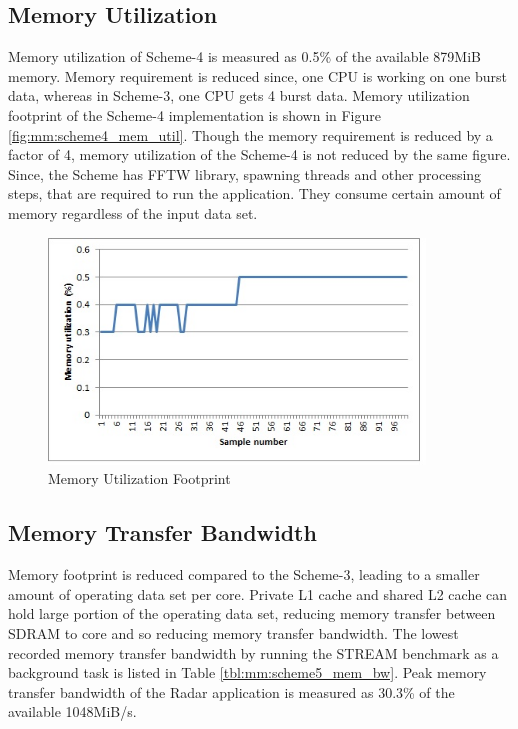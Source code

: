 \subsection{Memory Utilization}
\label{ss:mm:scheme5:mem_util}
Memory utilization of Scheme-4 is measured as 0.5\% of the available 879MiB memory. Memory requirement is reduced since, one CPU is working on one burst data, whereas in Scheme-3, one CPU gets 4 burst data. Memory utilization footprint of the Scheme-4 implementation is shown in Figure \ref{fig:mm:scheme4_mem_util}. Though the memory requirement is reduced by a factor of 4, memory utilization of the Scheme-4 is not reduced by the same figure. Since, the Scheme has FFTW library, spawning threads and other processing steps, that are required to run the application. They consume certain amount of memory regardless of the input data set.

\begin{figure}[h!]
	\centering
	\includegraphics[width=100mm]{figures/scheme5_mem_util}
	\caption{Memory Utilization Footprint}
	\label{fig:mm:scheme5_mem_util}
\end{figure}


\subsection{Memory Transfer Bandwidth}
\label{ss:mm:scheme5:bw_util}
Memory footprint is reduced compared to the Scheme-3, leading to a smaller amount of operating data set per core. Private L1 cache and shared L2 cache can hold large portion of the operating data set, reducing memory transfer between SDRAM to core and so reducing memory transfer bandwidth. The lowest recorded memory transfer bandwidth by running the STREAM benchmark as a background task is listed in Table \ref{tbl:mm:scheme5_mem_bw}. Peak memory transfer bandwidth of the Radar application is measured as 30.3\% of the available 1048MiB/s.

